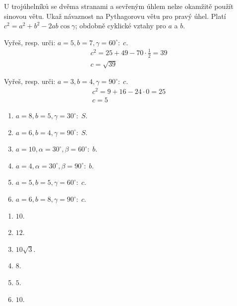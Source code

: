 \documentclass[11pt,a4paper]{article}
\begin{document}
U trojúhelníků se dvěma stranami a sevřeným úhlem nelze okamžitě použít sinovou větu. Ukaž návaznost na Pythagorovu větu pro pravý úhel.
Platí $c^2=a^2+b^2-2ab\cos\gamma$; obdobně cyklické vztahy pro $a$ a $b$.
\begin{prikladReseniBox}[title={Příklad 1}]
Vyřeš, resp. urči: $a=5,b=7,\gamma=60^\circ:\;c$.
\tcblower
\[\begin{aligned}c^2=25+49-70\cdot\frac{1}{2}=39 \\ c=\sqrt{39}\end{aligned}\]
\end{prikladReseniBox}
\begin{prikladReseniBox}[title={Příklad 2}]
Vyřeš, resp. urči: $a=3,b=4,\gamma=90^\circ:\;c$.
\tcblower
\[\begin{aligned}c^2=9+16-24\cdot0=25 \\ c=5\end{aligned}\]
\end{prikladReseniBox}
\begin{zadaniReseniBox}[title={Samostatná práce 1}]
\begin{enumerate}[label=\alph*)]
\item $a=8,b=5,\gamma=30^\circ:\;S$.
\item $a=6,b=4,\gamma=90^\circ:\;S$.
\item $a=10,\alpha=30^\circ,\beta=60^\circ:\;b$.
\item $a=4,\alpha=30^\circ,\beta=90^\circ:\;b$.
\item $a=5,b=5,\gamma=60^\circ:\;c$.
\item $a=6,b=8,\gamma=90^\circ:\;c$.
\end{enumerate}
\tcblower
\begin{enumerate}[label=\alph*)]
\item $10$.
\item $12$.
\item $10\sqrt3$.
\item $8$.
\item $5$.
\item $10$.
\end{enumerate}
\end{zadaniReseniBox}
\end{document}
